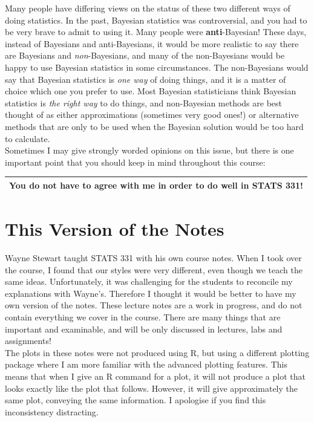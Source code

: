 Many people have differing views on the status of these two different
ways of doing statistics.
In the past, Bayesian statistics was controversial, and you had to be very
brave to admit to using it. Many people were {\bf anti}-Bayesian!
These days,
instead of Bayesians and anti-Bayesians, it would be more realistic to
say there are Bayesians and {\it non}-Bayesians, and many of the non-Bayesians
would be happy to use Bayesian statistics in some circumstances.
The non-Bayesians would say that
Bayesian statistics is {\it one way} of doing things, and it is a matter of
choice which one you prefer to use. Most Bayesian statisticians think Bayesian
statistics is {\it the right way} to do things, and non-Bayesian methods are
best thought of as either approximations (sometimes very good ones!)
or alternative methods that are only to be used when the Bayesian solution
would be too hard to calculate.\\

Sometimes I may give strongly worded opinions on this issue, but
there is one important point that you should keep in mind throughout
this course:\\

\begin{center}
\begin{tabular}{|c|}
\hline
{\bf You do not have to agree with me in order to do well in STATS 331!}\\
\hline
\end{tabular}
\end{center}

\section{This Version of the Notes}
Wayne Stewart taught STATS 331 with his own course notes. When I took over the
course, I found that our styles were very different, even though we teach
the same ideas. Unfortunately, it was challenging for the students to reconcile
my explanations with Wayne's. Therefore I thought it would be better to have
my own version of the notes. These lecture notes are a work in progress, and
do not contain everything we cover in the course. There are many things that are
important and examinable, and will be only discussed in lectures, labs and
assignments!\\

The plots in these notes were not produced using R, but using a different
plotting package where I am more familiar with the advanced plotting features.
This means that when I give an R command for a plot,
it will not produce a plot that looks exactly like the plot that follows.
However, it will give approximately the same plot, conveying the same information.
I apologise if you find this inconsistency distracting.\\

